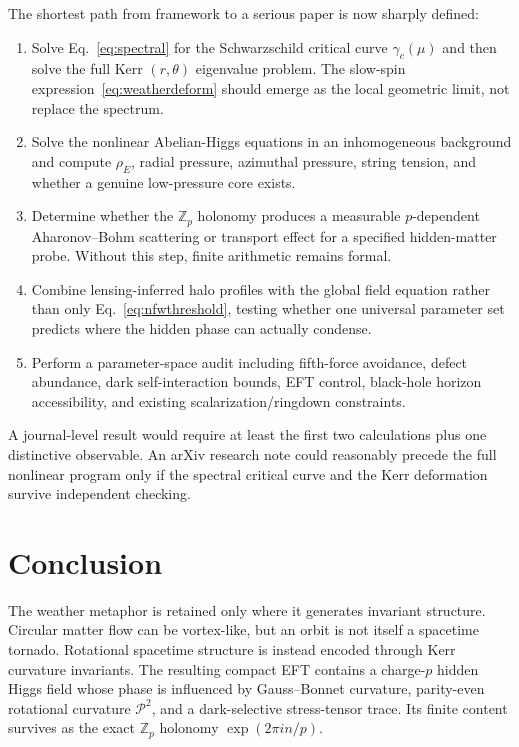 \documentclass[11pt]{article}
\newcommand{\Pontryagin}{\mathcal P}
\begin{document}
The shortest path from framework to a serious paper is now sharply defined:
\begin{enumerate}[leftmargin=1.7em]
    \item Solve Eq.~\eqref{eq:spectral} for the Schwarzschild critical curve $\gamma_c(\mu)$ and then solve the full Kerr $(r,\theta)$ eigenvalue problem.  The slow-spin expression~\eqref{eq:weatherdeform} should emerge as the local geometric limit, not replace the spectrum.
    \item Solve the nonlinear Abelian-Higgs equations in an inhomogeneous background and compute $\rho_E$, radial pressure, azimuthal pressure, string tension, and whether a genuine low-pressure core exists.
    \item Determine whether the $\mathbb Z_p$ holonomy produces a measurable $p$-dependent Aharonov--Bohm scattering or transport effect for a specified hidden-matter probe.  Without this step, finite arithmetic remains formal.
    \item Combine lensing-inferred halo profiles with the global field equation rather than only Eq.~\eqref{eq:nfwthreshold}, testing whether one universal parameter set predicts where the hidden phase can actually condense.
    \item Perform a parameter-space audit including fifth-force avoidance, defect abundance, dark self-interaction bounds, EFT control, black-hole horizon accessibility, and existing scalarization/ringdown constraints.
\end{enumerate}

A journal-level result would require at least the first two calculations plus one distinctive observable.  An arXiv research note could reasonably precede the full nonlinear program only if the spectral critical curve and the Kerr deformation survive independent checking.

\section{Conclusion}

The weather metaphor is retained only where it generates invariant structure.  Circular matter flow can be vortex-like, but an orbit is not itself a spacetime tornado.  Rotational spacetime structure is instead encoded through Kerr curvature invariants.  The resulting compact EFT contains a charge-$p$ hidden Higgs field whose phase is influenced by Gauss--Bonnet curvature, parity-even rotational curvature $\Pontryagin^2$, and a dark-selective stress-tensor trace.  Its finite content survives as the exact $\mathbb Z_p$ holonomy $\exp(2\pi i n/p)$.
\end{document}
